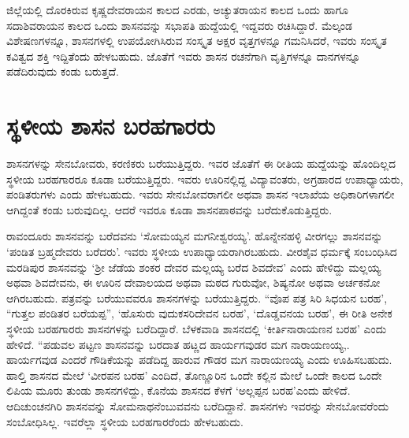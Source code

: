 ಜಿಲ್ಲೆಯಲ್ಲಿ ದೊರಕಿರುವ ಕೃಷ್ಣದೇವರಾಯನ ಕಾಲದ ಎರಡು, ಅಚ್ಯುತರಾಯನ ಕಾಲದ ಒಂದು ಹಾಗೂ ಸದಾಶಿವರಾಯನ ಕಾಲದ ಒಂದು ಶಾಸನವನ್ನು ಸಭಾಪತಿ ಹುದ್ದೆಯಲ್ಲಿ ಇದ್ದವರು ರಚಿಸಿದ್ದಾರೆ. ಮೆಲ್ಕಂಡ ವಿಶೇಷಣಗಳನ್ನೂ, ಶಾಸನಗಳಲ್ಲಿ ಉಪಯೋಗಿಸಿರುವ ಸಂಸ್ಕೃತ ಅಕ್ಷರ ವೃತ್ತಗಳನ್ನೂ ಗಮನಿಸಿದರೆ, ಇವರು ಸಂಸ್ಕೃತ ಕವಿತ್ವದ ಶಕ್ತಿ ಇದ್ದಿತೆಂದು ಹೇಳಬಹುದು. ಜೊತೆಗೆ ಇವರು ಶಾಸನ ರಚನೆಗಾಗಿ ವೃತ್ತಿಗಳನ್ನೂ ದಾನಗಳನ್ನೂ ಪಡೆದಿರುವುದು ಕಂಡು ಬರುತ್ತದೆ.

\newpage

\section*{ಸ್ಥಳೀಯ ಶಾಸನ ಬರಹಗಾರರು}

ಶಾಸನಗಳನ್ನು ಸೇನಬೋವರು, ಕರಣಿಕರು ಬರೆಯುತ್ತಿದ್ದರು. ಇವರ ಜೊತೆಗೆ ಈ ರೀತಿಯ ಹುದ್ದೆಯನ್ನು ಹೊಂದಿಲ್ಲದ ಸ್ಥಳೀಯ ಬರಹಗಾರರೂ ಕೂಡಾ ಬರೆಯುತ್ತಿದ್ದರು. ಇವರು ಊರಿನಲ್ಲಿದ್ದ ವಿದ್ಯಾವಂತರು, ಅಗ್ರಹಾರದ ಉಪಾಧ್ಯಾಯರು, ಪಂಡಿತರುಗಳು ಎಂದು ಹೇಳಬಹುದು. ಇವರು ಸೇನಬೋವರಾಗಲೀ ಅಥವಾ ಶಾಸನ ಇಲಾಖೆಯ ಅಧಿಕಾರಿಗಳಾಗಲೀ ಆಗಿದ್ದಂತೆ ಕಂಡು ಬರುವುದಿಲ್ಲ. ಆದರೆ ಇವರೂ ಕೂಡಾ ಶಾಸನಪಾಠವನ್ನು ಬರೆದುಕೊಡುತ್ತಿದ್ದರು.

ರಾವಂದೂರು ಶಾಸನವನ್ನು ಬರೆದವನು ‘ಸೋಮಯ್ಯನ ಮಗನೀಶ್ವರಯ್ಯ’. ಹೊನ್ನೇನಹಳ್ಳಿ ವೀರಗಲ್ಲು ಶಾಸನವನ್ನು ‘ಪಂಡಿತ ಬ್ರಹ್ಮದೇವರು ಬರೆದರು’. ಇವರು ಸ್ಥಳೀಯ ಉಪಾಧ್ಯಾಯರಾಗಿರಬಹುದು. ವೀರಶೈವ ಧರ್ಮಕ್ಕೆ ಸಂಬಂಧಿಸಿದ ಮರಡಿಪುರ ಶಾಸನವನ್ನು ‘ಶ‍್ರೀ ಜೆಡೆಯ ಶಂಕರ ದೇವರ ಮಲ್ಲಯ್ಯ ಬರೆದ ಶಿವದೇವ’ ಎಂದು ಹೇಳಿದ್ದು ಮಲ್ಲಯ್ಯ ಅಥವಾ ಶಿವದೇವನು, ಈ ಊರಿನ ದೇವಾಲಯದ ಅಥವಾ ಮಠದ ಗುರುವೋ, ಶಿಷ್ಯನೋ ಅಥವಾ ಅರ್ಚಕನೋ ಆಗಿರಬಹುದು. ಪತ್ರವನ್ನು ಬರೆಯುವವರೂ ಶಾಸನಗಳನ್ನು ಬರೆಯುತ್ತಿದ್ದರು. “ವೊಪ ಪತ್ರ ಸಿರಿ ಸಿಧಯನ ಬರಹ’, “ಗುತ್ತಲ ಪಂಡಿತರ ಬರೆಯಪ್ಪ”, ‘ಹೊಸುರು ವುದುಕಸರಿದೇವನ ಬರಹ’, ‘ದೊಡ್ಡವನಯ ಬರಹ’, ಈ ರೀತಿ ಅನೇಕ ಸ್ಥಳೀಯ ಬರಹಗಾರರು ಶಾಸನಗಳನ್ನು ಬರೆದಿದ್ದಾರೆ. ಬೆಳಕವಾಡಿ ಶಾಸನದಲ್ಲಿ ‘ಕೀರ್ತಿನಾರಾಯಣನ ಬರಹ’ ಎಂದು ಹೇಳಿದೆ. “ಪಡುವಲ ಪಟ್ಟಣ ಶಾಸನವನ್ನು ಬರದಾತ ಹಟ್ಣದ ಹಾರ್ಯಗವುಡರ ಮಗ ನಾರಾಯಣಯ್ಯ,. ಹಾರ್ಯಗವುಡ ಎಂದರೆ ಗೌಡಿಕೆಯನ್ನು ಪಡೆದಿದ್ದ ಹಾರುವ ಗೌಡರ ಮಗ ನಾರಾಯಣಯ್ಯ ಎಂದು ಊಹಿಸಬಹುದು. ಹಾಲ್ತಿ ಶಾಸನದ ಮೇಲೆ ‘ವೀರಪನ ಬರಹ’ ಎಂದಿದೆ, ತೊಣ್ಣೂರಿನ ಒಂದೇ ಕಲ್ಲಿನ ಮೇಲೆ ಒಂದೇ ಕಾಲದ ಒಂದೇ ಲಿಪಿಯ ಮೂರು ತುಂಡು ಶಾಸನಗಳಿದ್ದು, ಕೊನೆಯ ಶಾಸನದ ಕೆಳಗೆ ‘ಅಲ್ಲಪ್ಪನ ಬರಹ’ಎಂದು ಹೇಳಿದೆ. ಆದಿಚುಂಚನಗಿರಿ ಶಾಸನವನ್ನು ಸೋಮನಾಥನೆಂಬುವವನು ಬರೆದಿದ್ದಾನೆ. ಶಾಸನಗಳು ಇವರನ್ನು ಸೇನಬೋವರೆಂದು ಸಂಬೋಧಿಸಿಲ್ಲ. ಇವರೆಲ್ಲಾ ಸ್ಥಳೀಯ ಬರಹಗಾರರೆಂದು ಹೇಳಬಹುದು.


